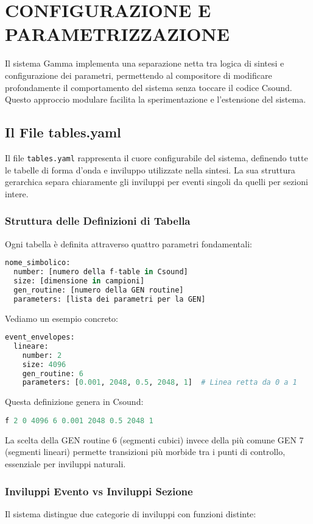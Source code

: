 
\section{CONFIGURAZIONE E PARAMETRIZZAZIONE}
Il sistema Gamma implementa una separazione netta tra logica di sintesi e configurazione dei parametri, permettendo al compositore di modificare profondamente il comportamento del sistema senza toccare il codice Csound. Questo approccio modulare facilita la sperimentazione e l'estensione del sistema.
\subsection{Il File tables.yaml}
Il file \texttt{tables.yaml} rappresenta il cuore configurabile del sistema, definendo tutte le tabelle di forma d'onda e inviluppo utilizzate nella sintesi. La sua struttura gerarchica separa chiaramente gli inviluppi per eventi singoli da quelli per sezioni intere.
\subsubsection{Struttura delle Definizioni di Tabella}
Ogni tabella è definita attraverso quattro parametri fondamentali:

\begin{lstlisting}[language=Python]
nome_simbolico:
  number: [numero della f-table in Csound]
  size: [dimensione in campioni]
  gen_routine: [numero della GEN routine]
  parameters: [lista dei parametri per la GEN]
\end{lstlisting}

Vediamo un esempio concreto:

\begin{lstlisting}[language=Python]
event_envelopes:
  lineare:
    number: 2
    size: 4096
    gen_routine: 6
    parameters: [0.001, 2048, 0.5, 2048, 1]  # Linea retta da 0 a 1
\end{lstlisting}

Questa definizione genera in Csound:
\begin{lstlisting}[language=C]
f 2 0 4096 6 0.001 2048 0.5 2048 1
\end{lstlisting}

La scelta della GEN routine 6 (segmenti cubici) invece della più comune GEN 7 (segmenti lineari) permette transizioni più morbide tra i punti di controllo, essenziale per inviluppi naturali.
\subsubsection{Inviluppi Evento vs Inviluppi Sezione}
Il sistema distingue due categorie di inviluppi con funzioni distinte:

